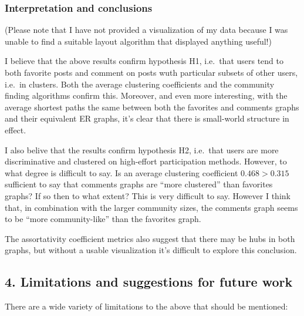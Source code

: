 \subsubsection{Interpretation and conclusions}

(Please note that I have not provided a visualization of my data because
I was unable to find a suitable layout algorithm that displayed anything
useful!)

I believe that the above results confirm hypothesis H1, i.e.~that users
tend to both favorite posts and comment on posts wuth particular subsets
of other users, i.e.~in clusters. Both the average clustering
coefficients and the community finding algorithms confirm this.
Moreover, and even more interesting, with the average shortest paths the
same between both the favorites and comments graphs and their equivalent
ER graphs, it's clear that there is small-world structure in effect.

I also belive that the results confirm hypothesis H2, i.e.~that users
are more discriminative and clustered on high-effort participation
methods. However, to what degree is difficult to say. Is an average
clustering coefficient $0.468 > 0.315$ sufficient to say that comments
graphs are ``more clustered'' than favorites graphs? If so then to what
extent? This is very difficult to say. However I think that, in
combination with the larger community sizes, the comments graph seems to
be ``more community-like'' than the favorites graph.

The assortativity coefficient metrics also suggest that there may be
hubs in both graphs, but without a usable visualization it's difficult
to explore this conclusion.

\subsection{4. Limitations and suggestions for future work}

There are a wide variety of limitations to the above that should be
mentioned:


